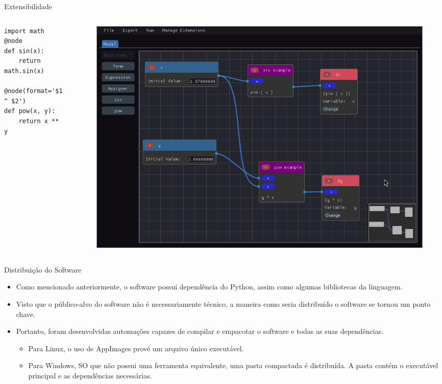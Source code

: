 \begin{frame}[fragile]{Extensibilidade}
    \begin{columns}
        \begin{column}{.3\textwidth}
            \begin{verbatim}
import math
@node
def sin(x):
    return math.sin(x)

@node(format='$1 ^ $2')
def pow(x, y):
    return x ** y
            \end{verbatim}
        \end{column}
        \begin{column}{.7\textwidth}
            \begin{figure}
                \centering
                \includegraphics[width=\textwidth]{contents/imgs/ode-designer/ext-sin-pow.png}
            \end{figure}
        \end{column}
    \end{columns}
\end{frame}

\begin{frame}{Distribuição do Software}
    \begin{itemize}
        \item Como mencionado anteriormente, o software possui dependência do Python, assim como algumas bibliotecas da linguagem.
        \item Visto que o público-alvo do software não é necessariamente técnico, a maneira como seria distribuído o software se tornou um ponto chave.
        \item Portanto, foram desenvolvidas automações capazes de compilar e empacotar o software e todas as suas dependências.
        \begin{itemize}
            \item Para Linux, o uso de AppImages provê um arquivo único executável.
            \item Para Windows, SO que não possui uma ferramenta equivalente, uma pasta compactada é distribuída. A pasta contém o executável principal e as dependências necessárias.
        \end{itemize}
    \end{itemize}
\end{frame}
